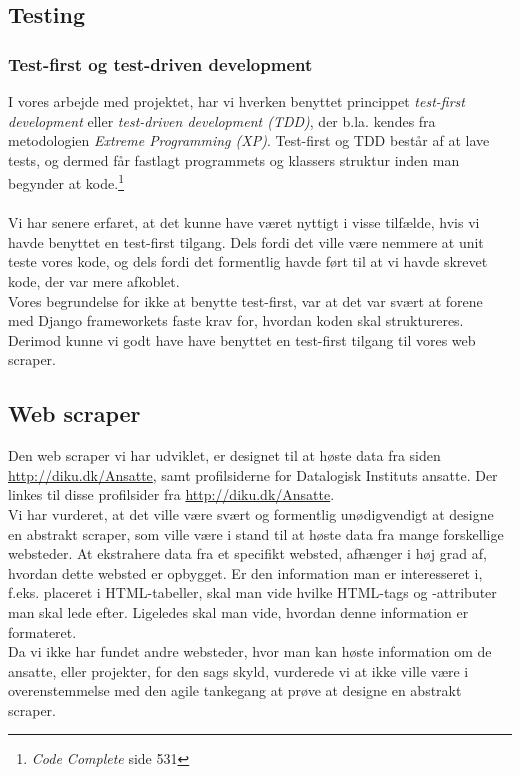 \documentclass[12pt]{article}
\begin{document}
\subsection{Testing}
\subsubsection{Test-first og test-driven development}
\label{sec:testfirst}
I vores arbejde med projektet, har vi hverken benyttet princippet \textit{test-first development} eller \textit{test-driven development (TDD)}, der b.la. kendes fra metodologien \textit{Extreme Programming (XP)}. Test-first og TDD består af at lave tests, og dermed får fastlagt programmets og klassers struktur inden man begynder at kode.\footnote{\emph{Code Complete} side 531}\\
\\
Vi har senere erfaret, at det kunne have været nyttigt i visse tilfælde, hvis vi havde benyttet en test-first tilgang. Dels fordi det ville være nemmere at unit teste vores kode, og dels fordi det formentlig havde ført til at vi havde skrevet kode, der var mere afkoblet. \\
Vores begrundelse for ikke at benytte test-first, var at det var svært at forene med Django frameworkets faste krav for, hvordan koden skal struktureres. \\
Derimod kunne vi godt have have benyttet en test-first tilgang til vores web scraper.

\subsection{Web scraper}
Den web scraper vi har udviklet, er designet til at høste data fra siden \url{http://diku.dk/Ansatte}, samt profilsiderne for Datalogisk Instituts ansatte. Der linkes til disse profilsider fra \url{http://diku.dk/Ansatte}.\\
Vi har vurderet, at det ville være svært og formentlig unødigvendigt at designe en abstrakt scraper, som ville være i stand til at høste data fra mange forskellige websteder. At ekstrahere data fra et specifikt websted, afhænger i høj grad af, hvordan dette websted er opbygget. Er den information man er interesseret i, f.eks. placeret i  HTML-tabeller, skal man vide hvilke HTML-tags og -attributer man skal lede efter. Ligeledes skal man vide, hvordan denne information er formateret. \\
Da vi ikke har fundet andre websteder, hvor man kan høste information om de ansatte, eller projekter, for den sags skyld, vurderede vi at ikke ville være i overenstemmelse med den agile tankegang at prøve at designe en abstrakt scraper.
\end{document}
